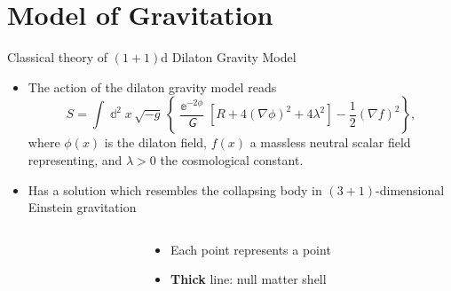 \documentclass{beamer}
\newcommand{\ee}{{\Bbbe}}
\newcommand{\rbr}[1]{{\left(#1\right)}}
\newcommand{\sbr}[1]{{\left[#1\right]}}
\newcommand{\cbr}[1]{{\left\{#1\right\}}}
\newcommand{\rfun}[2]{{#1}\mathopen{}\left(#2\right)\mathclose{}}
\newcommand{\dd}{\Bbbd}
\newcommand{\ol}[1]{{\overline{{#1}}}}
\newcommand{\nG}{\mitsansG} %
\begin{document}
\section{Model of Gravitation}

\begin{frame}[allowframebreaks]{Classical theory of $\rbr{1+1}$d 
Dilaton Gravity Model}{\cite{Callan1992,Demers1996,Ashtekar2011}}%

\begin{itemize}
\item The action of the dilaton gravity model reads
\begin{equation}
S = \int \dd^2 x\,\sqrt{-g}\,\cbr{\frac{\ee^{-2\phi}}{\nG}
\sbr{R+4\rbr{\nabla \phi}^2 + 4\lambda^2}
-\frac{1}{2}\rbr{\nabla f}^2},
\end{equation}
where $\rfun{\phi}{x}$ is the dilaton field, $\rfun{f}{x}$ a massless 
neutral scalar field representing, and $\lambda > 0$ the cosmological constant.

\item Has a solution which \alert{resembles} the collapsing body in 
$\rbr{3+1}$-dimensional Einstein gravitation
\end{itemize}

\begin{columns}
\begin{column}{.7\linewidth}
\begin{center}

\end{center}

\end{column}
\begin{column}{.3\linewidth}
\begin{itemize}
 \item Each point represents a \alert{point}
 \item \textbf{Thick} line: null matter \alert{shell}
\end{itemize}
\end{column}
 
\end{columns}


\end{frame}
\end{document}
